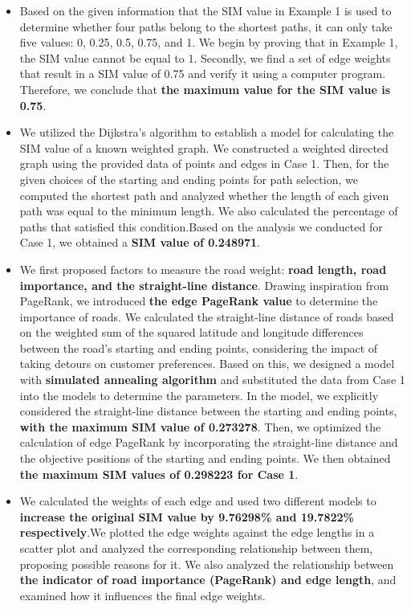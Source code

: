 \begin{itemize}
    \item Based on the given information that the SIM value in Example 1 is used to determine whether four paths belong to the shortest paths, it can only take five values: 0, 0.25, 0.5, 0.75, and 1. We begin by proving that in Example 1, the SIM value cannot be equal to 1. Secondly, we find a set of edge weights that result in a SIM value of 0.75 and verify it using a computer program. Therefore, we conclude that \textbf{the maximum value for the SIM value is 0.75}.
    \item We utilized the Dijkstra's algorithm to establish a model for calculating the SIM value of a known weighted graph. We constructed a weighted directed graph using the provided data of points and edges in Case 1. Then, for the given choices of the starting and ending points for path selection, we computed the shortest path and analyzed whether the length of each given path was equal to the minimum length. We also calculated the percentage of paths that satisfied this condition.Based on the analysis we conducted for Case 1, we obtained a \textbf{SIM value of 0.248971}.
    \item We first proposed factors to measure the road weight: \textbf{road length, road importance, and the straight-line distance}. Drawing inspiration from PageRank, we introduced \textbf{the edge PageRank value} to determine the importance of roads. We calculated the straight-line distance of roads based on the weighted sum of the squared latitude and longitude differences between the road's starting and ending points, considering the impact of taking detours on customer preferences. Based on this, we designed a model with \textbf{simulated annealing algorithm} and substituted the data from Case 1 into the models to determine the parameters. In the model, we explicitly considered the straight-line distance between the starting and ending points, \textbf{with the  maximum SIM value of 0.273278}. Then, we optimized the calculation of edge PageRank by incorporating the straight-line distance and the objective positions of the starting and ending points. We then obtained \textbf{the maximum SIM values of 0.298223 for Case 1}.
    \item We calculated the weights of each edge and used two different models to \textbf{increase the original SIM value by 9.76298\% and 19.7822\%  respectively}.We plotted the edge weights against the edge lengths in a scatter plot and analyzed the corresponding relationship between them, proposing possible reasons for it. We also analyzed the relationship between \textbf{the indicator of road importance (PageRank) and edge length}, and examined how it influences the final edge weights.
\end{itemize}


